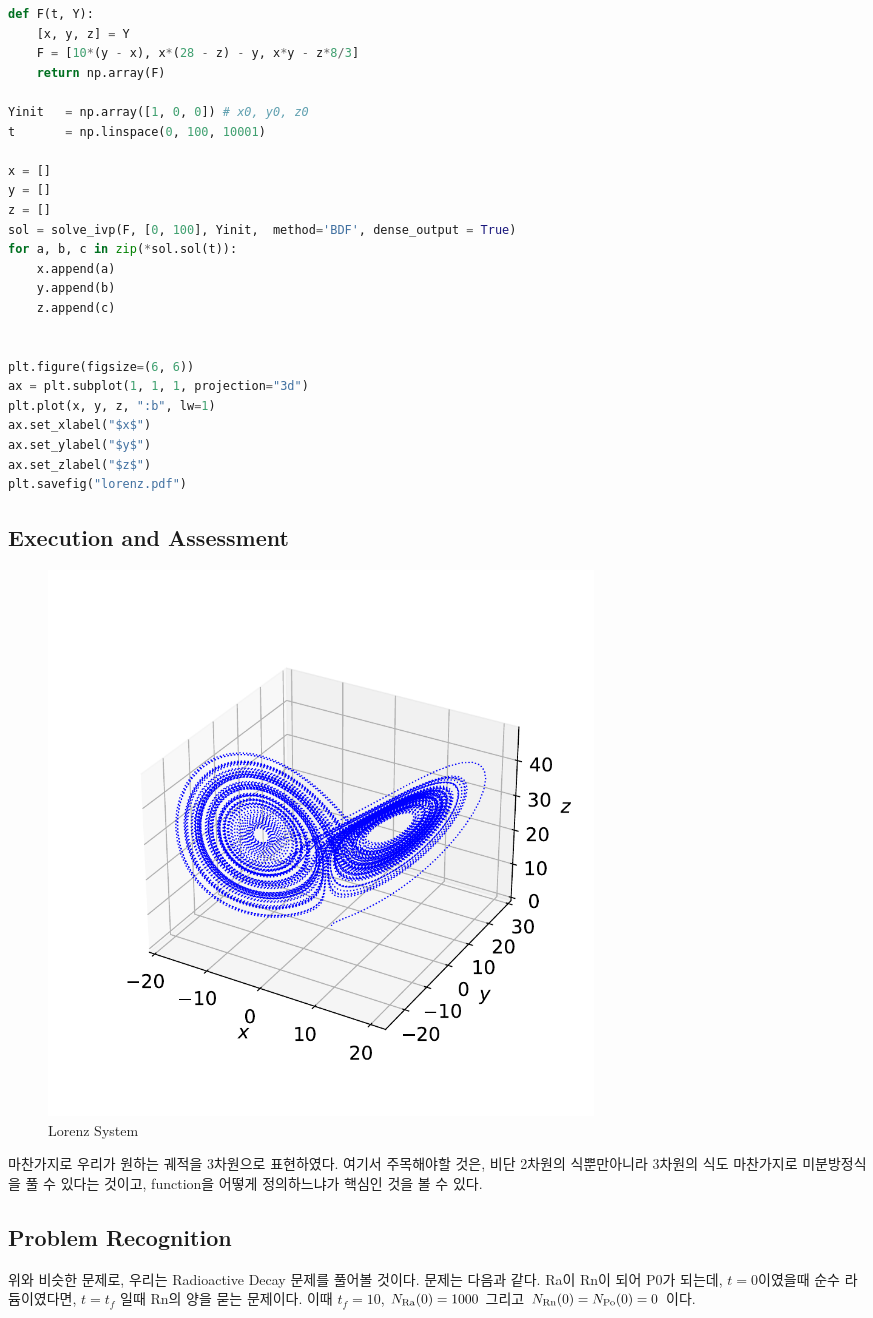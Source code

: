 \documentclass[11pt]{article}
\begin{document}
\begin{lstlisting}[language=Python]
def F(t, Y):
    [x, y, z] = Y
    F = [10*(y - x), x*(28 - z) - y, x*y - z*8/3]
    return np.array(F)

Yinit   = np.array([1, 0, 0]) # x0, y0, z0
t       = np.linspace(0, 100, 10001)

x = []
y = []
z = []
sol = solve_ivp(F, [0, 100], Yinit,  method='BDF', dense_output = True)
for a, b, c in zip(*sol.sol(t)):
    x.append(a)
    y.append(b)
    z.append(c)
    

plt.figure(figsize=(6, 6))
ax = plt.subplot(1, 1, 1, projection="3d")
plt.plot(x, y, z, ":b", lw=1)
ax.set_xlabel("$x$")
ax.set_ylabel("$y$")
ax.set_zlabel("$z$")
plt.savefig("lorenz.pdf")
\end{lstlisting}





\subsection{Execution and Assessment}
\begin{figure}[!ht]
  \centering
  \includegraphics[width=0.7\textwidth]{lorenz.pdf}
  \caption{Lorenz System}
\end{figure}
마찬가지로 우리가 원하는 궤적을 3차원으로 표현하였다. 여기서 주목해야할 것은, 비단 2차원의 식뿐만아니라 3차원의 식도 마찬가지로 미분방정식을 풀 수 있다는 것이고, function을 어떻게 정의하느냐가 핵심인 것을 볼 수 있다.








\subsection{Problem Recognition} 
위와 비슷한 문제로, 우리는 Radioactive Decay 문제를 풀어볼 것이다. 문제는 다음과 같다. Ra이 Rn이 되어 P0가 되는데, $t = 0$이였을때 순수 라듐이였다면, $t = t_{f}$ 일때 Rn의 양을 묻는 문제이다. 이때 $t_f = 10$, $N_{\rm Ra}(0) = 1000$ 그리고 $N_{\rm Rn}(0) = N_{\rm Po}(0) = 0$ 이다.
\end{document}
